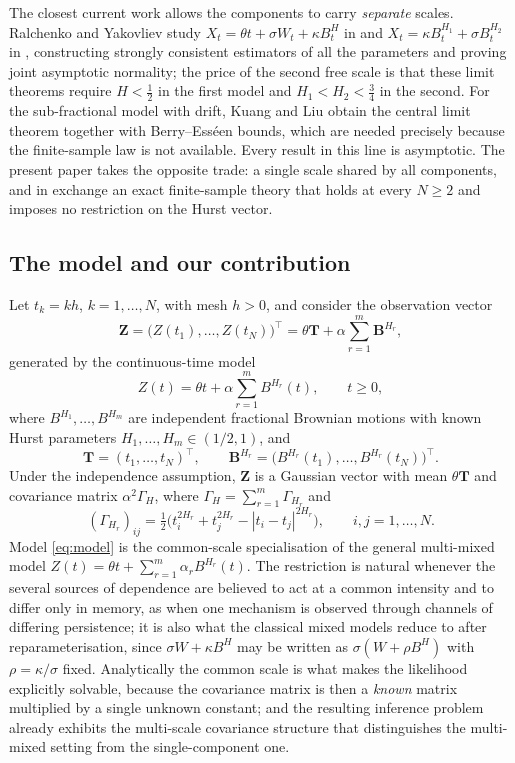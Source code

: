 \documentclass[11pt,reqno]{amsart}
\numberwithin{equation}{section}
\theoremstyle{plain}
\theoremstyle{definition}
\theoremstyle{remark}
\newcommand{\bT}{\mathbf{T}}
\newcommand{\bZ}{\mathbf{Z}}
\newcommand{\bB}{\mathbf{B}}
\newcommand{\GH}{\Gamma_H}
\begin{document}
The closest current work allows the components to carry \emph{separate} scales.
Ralchenko and Yakovliev study $X_t=\theta t+\sigma W_t+\kappa B^{H}_t$ in \cite{RY23} and
$X_t=\kappa B^{H_1}_t+\sigma B^{H_2}_t$ in \cite{RY24}, constructing strongly consistent
estimators of all the parameters and proving joint asymptotic normality; the price of the
second free scale is that these limit theorems require $H<\tfrac12$ in the first model
and $H_1<H_2<\tfrac34$ in the second. For the sub-fractional model with drift, Kuang and
Liu \cite{KL15} obtain the central limit theorem together with Berry--Ess\'een bounds,
which are needed precisely because the finite-sample law is not available. Every result
in this line is asymptotic. The present paper takes the opposite trade: a single scale
shared by all components, and in exchange an exact finite-sample theory that holds at
every $N\ge2$ and imposes no restriction on the Hurst vector.

\subsection*{The model and our contribution}
Let $t_k=kh$, $k=1,\dots,N$, with mesh $h>0$, and consider the observation vector
\begin{equation}\label{eq:obsvec}
  \bZ=\bigl(Z(t_1),\dots,Z(t_N)\bigr)^{\top}=\theta\bT+\alpha\sum_{r=1}^{m}\bB^{H_r},
\end{equation}
generated by the continuous-time model
\begin{equation}\label{eq:model}
  Z(t)=\theta t+\alpha\sum_{r=1}^{m}B^{H_r}(t),\qquad t\ge0,
\end{equation}
where $B^{H_1},\dots,B^{H_m}$ are independent fractional Brownian motions with known
Hurst parameters $H_1,\dots,H_m\in(1/2,1)$, and
\[
  \bT=(t_1,\dots,t_N)^{\top},\qquad
  \bB^{H_r}=\bigl(B^{H_r}(t_1),\dots,B^{H_r}(t_N)\bigr)^{\top}.
\]
Under the independence assumption, $\bZ$ is a Gaussian vector with mean $\theta\bT$ and
covariance matrix $\alpha^{2}\GH$, where $\GH=\sum_{r=1}^{m}\Gamma_{H_r}$ and
\begin{equation}\label{eq:GammaHr}
  (\Gamma_{H_r})_{ij}=\tfrac12\bigl(t_i^{2H_r}+t_j^{2H_r}-|t_i-t_j|^{2H_r}\bigr),
  \qquad i,j=1,\dots,N .
\end{equation}
Model \eqref{eq:model} is the common-scale specialisation of the general multi-mixed
model $Z(t)=\theta t+\sum_{r=1}^{m}\alpha_rB^{H_r}(t)$. The restriction is natural
whenever the several sources of dependence are believed to act at a common intensity and
to differ only in memory, as when one mechanism is observed through channels of differing
persistence; it is also what the classical mixed models reduce to after
reparameterisation, since $\sigma W+\kappa B^{H}$ may be written as
$\sigma(W+\rho B^{H})$ with $\rho=\kappa/\sigma$ fixed. Analytically the common scale is
what makes the likelihood explicitly solvable, because the covariance matrix is then a
\emph{known} matrix multiplied by a single unknown constant; and the resulting inference
problem already exhibits the multi-scale covariance structure that distinguishes the
multi-mixed setting from the single-component one.
\end{document}
